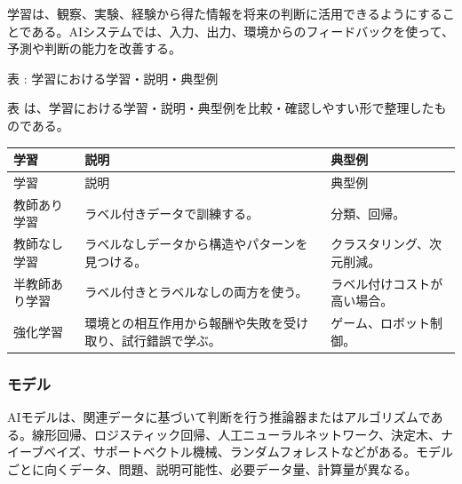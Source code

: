 学習は、観察、実験、経験から得た情報を将来の判断に活用できるようにすることである。AIシステムでは、入力、出力、環境からのフィードバックを使って、予測や判断の能力を改善する。

\par\smallskip\noindent{}\label{tab:ch16-26}表 \thetable: 学習における学習・説明・典型例\par\smallskip
表 \thetable は、学習における学習・説明・典型例を比較・確認しやすい形で整理したものである。\par\smallskip
\begin{longtable}{>{\raggedright\arraybackslash}p{}>{\raggedright\arraybackslash}p{}>{\raggedright\arraybackslash}p{}}
\toprule
学習 & 説明 & 典型例 \\
\midrule
\endfirsthead
\toprule
学習 & 説明 & 典型例 \\
\midrule
\endhead
教師あり学習 & ラベル付きデータで訓練する。 & 分類、回帰。 \\
教師なし学習 & ラベルなしデータから構造やパターンを見つける。 & クラスタリング、次元削減。 \\
半教師あり学習 & ラベル付きとラベルなしの両方を使う。 & ラベル付けコストが高い場合。 \\
強化学習 & 環境との相互作用から報酬や失敗を受け取り、試行錯誤で学ぶ。 & ゲーム、ロボット制御。 \\
\bottomrule
\end{longtable}

\subsubsection{モデル}

AIモデルは、関連データに基づいて判断を行う推論器またはアルゴリズムである。線形回帰、ロジスティック回帰、人工ニューラルネットワーク、決定木、ナイーブベイズ、サポートベクトル機械、ランダムフォレストなどがある。モデルごとに向くデータ、問題、説明可能性、必要データ量、計算量が異なる。


